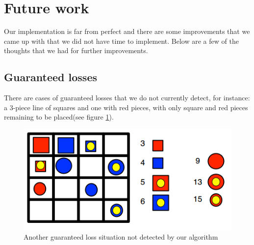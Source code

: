 \section{Future work}\label{future work}
Our implementation is far from perfect and there are some improvements
that we came up with that we did not have time to implement. Below
are a few of the thoughts that we had for further improvements.

\subsection{Guaranteed losses}
There are cases of guaranteed losses that we do not currently detect, for 
instance: a 3-piece line of squares and one with red pieces, with only 
square and red pieces remaining to be placed(see figure \ref{fig:gloss2}).

\begin{figure}
	\includegraphics{pictures/gloss2.png}
	\caption{Another guaranteed loss situation not detected by
	our algorithm}
	\label{fig:gloss2}
\end{figure}
